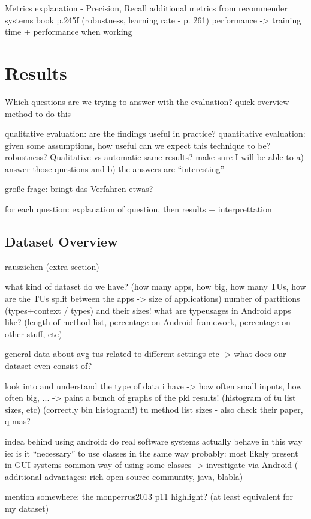 Metrics explanation - Precision, Recall
    additional metrics from recommender systems book p.245f (robustness, learning rate - p. 261)
    performance -> training time + performance when working

\section{Results}
Which questions are we trying to answer with the evaluation?
quick overview + method to do this

qualitative evaluation: are the findings useful in practice?
quantitative evaluation: given some assumptions, how useful can we expect this technique to be? robustness? Qualitative vs automatic same results?
make sure I will be able to a) answer those questions and b) the answers are ``interesting''

große frage: bringt das Verfahren etwas?

for each question: explanation of question, then results + interprettation
\subsection{Dataset Overview}
rausziehen (extra section)

what kind of dataset do we have? (how many apps, how big, how many TUs, how are the TUs split between the apps -> size of applications)
number of partitions (types+context / types) and their sizes!
what are typeusages in Android apps like? (length of method list, percentage on Android framework, percentage on other stuff, etc) 

general data about avg tus related to different settings etc -> what does our dataset even consist of?

look into and understand the type of data i have -> how often small inputs, how often big, ...
-> paint a bunch of graphs of the pkl results! (histogram of tu list sizes,  etc) (correctly bin histogram!)
 tu method list sizes - also check their paper, q mas?

indea behind using android:
    do real software systems actually behave in this way
    ie: is it ``necessary'' to use classes in the same way
    probably: most likely present in GUI systems
    common way of using some classes -> investigate via Android (+ additional advantages: rich open source community, java, blabla)

mention somewhere: the monperrus2013 p11 highlight? (at least equivalent for my dataset)


